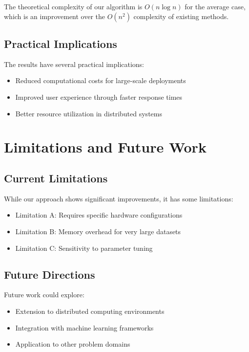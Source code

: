 The theoretical complexity of our algorithm is $O(n \log n)$ for the average case, which is an improvement over the $O(n^2)$ complexity of existing methods.

\subsection{Practical Implications}

The results have several practical implications:
\begin{itemize}
    \item Reduced computational costs for large-scale deployments
    \item Improved user experience through faster response times
    \item Better resource utilization in distributed systems
\end{itemize}

\section{Limitations and Future Work}

\subsection{Current Limitations}

While our approach shows significant improvements, it has some limitations:
\begin{itemize}
    \item Limitation A: Requires specific hardware configurations
    \item Limitation B: Memory overhead for very large datasets
    \item Limitation C: Sensitivity to parameter tuning
\end{itemize}

\subsection{Future Directions}

Future work could explore:
\begin{itemize}
    \item Extension to distributed computing environments
    \item Integration with machine learning frameworks
    \item Application to other problem domains
\end{itemize}

